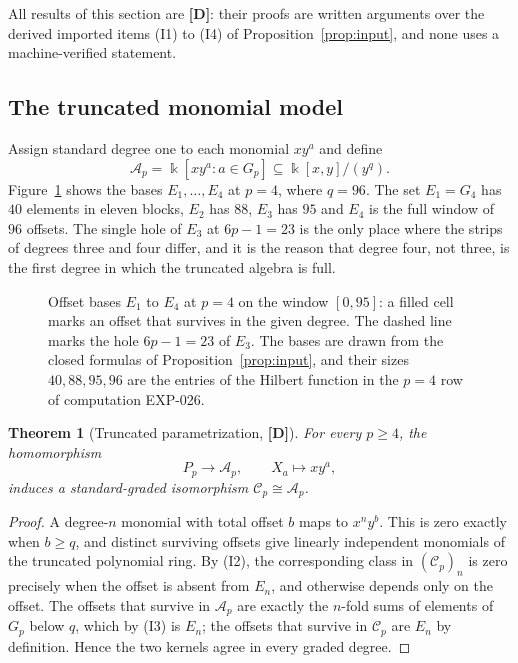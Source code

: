 \documentclass[11pt]{article}
\newtheorem{theorem}{Theorem}[section]
\theoremstyle{definition}
\theoremstyle{remark}
\newcommand{\kfield}{\Bbbk}
\newcommand{\Cfiber}{\mathcal{C}}
\newcommand{\mD}{\textbf{[D]}}
\begin{document}
All results of this section are \mD{}: their proofs are written arguments over the derived imported
items (I1) to (I4) of Proposition~\ref{prop:input}, and none uses a machine-verified statement.

\subsection{The truncated monomial model}

Assign standard degree one to each monomial $xy^a$ and define
\[
 \mathcal A_p=\kfield[xy^a:a\in G_p]\subseteq\kfield[x,y]/(y^q).
\]
Figure~\ref{fig:strips} shows the bases $E_1,\ldots,E_4$ at $p=4$, where $q=96$. The set $E_1=G_4$
has $40$ elements in eleven blocks, $E_2$ has $88$, $E_3$ has $95$ and $E_4$ is the full window of $96$
offsets. The single hole of $E_3$ at $6p-1=23$ is the only place where the strips of degrees
three and four differ, and it is the reason that degree four, not three, is the first degree in
which the truncated algebra is full.

\begin{figure}[ht]
\centering

\caption{Offset bases $E_1$ to $E_4$ at $p=4$ on the window $[0,95]$: a filled cell marks an offset
that survives in the given degree. The dashed line marks the hole $6p-1=23$ of $E_3$. The bases
are drawn from the closed formulas of Proposition~\ref{prop:input}, and their sizes
$40,88,95,96$ are the entries of the Hilbert function in the $p=4$ row of computation EXP-026.}
\label{fig:strips}
\end{figure}

\begin{theorem}[Truncated parametrization, \mD]\label{thm:parametrization}
For every $p\geq4$, the homomorphism
\[
 P_p\longrightarrow\mathcal A_p,
 \qquad X_a\longmapsto xy^a,
\]
induces a standard-graded isomorphism $\Cfiber_p\cong\mathcal A_p$.
\end{theorem}

\begin{proof}
A degree-$n$ monomial with total offset $b$ maps to $x^ny^b$. This is zero exactly when
$b\geq q$, and distinct surviving offsets give linearly independent monomials of the truncated
polynomial ring. By (I2), the corresponding class in $(\Cfiber_p)_n$ is zero precisely when the
offset is absent from $E_n$, and otherwise depends only on the offset. The offsets that survive
in $\mathcal A_p$ are exactly the $n$-fold sums of elements of $G_p$ below $q$, which by (I3) is
$E_n$; the offsets that survive in $\Cfiber_p$ are $E_n$ by definition. Hence the two kernels
agree in every graded degree.
\end{proof}
\end{document}
